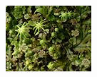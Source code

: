 \documentclass[11pt]{beamer}
\begin{document}
\begin{frame}
\begin{columns}[T]
\begin{figure}
			\includegraphics[height=0.25\textheight, width=\textwidth]{Marchantia.jpg}
		\end{figure}
	\end{columns}
\end{frame}
\end{document}
